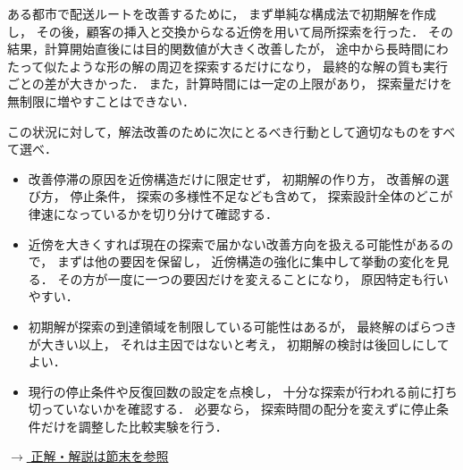 \begin{example}[title={クイズ7：解法の設計1}]
ある都市で配送ルートを改善するために，
まず単純な構成法で初期解を作成し，
その後，顧客の挿入と交換からなる近傍を用いて局所探索を行った．
その結果，計算開始直後には目的関数値が大きく改善したが，
途中から長時間にわたって似たような形の解の周辺を探索するだけになり，
最終的な解の質も実行ごとの差が大きかった．
また，計算時間には一定の上限があり，
探索量だけを無制限に増やすことはできない．

この状況に対して，解法改善のために次にとるべき行動として適切なものをすべて選べ．

\begin{itemize}
\item[(ア)]
改善停滞の原因を近傍構造だけに限定せず，
初期解の作り方，
改善解の選び方，
停止条件，
探索の多様性不足なども含めて，
探索設計全体のどこが律速になっているかを切り分けて確認する．

\item[(イ)]
近傍を大きくすれば現在の探索で届かない改善方向を扱える可能性があるので，
まずは他の要因を保留し，
近傍構造の強化に集中して挙動の変化を見る．
その方が一度に一つの要因だけを変えることになり，
原因特定も行いやすい．

\item[(ウ)]
初期解が探索の到達領域を制限している可能性はあるが，
最終解のばらつきが大きい以上，
それは主因ではないと考え，
初期解の検討は後回しにしてよい．

\item[(エ)]
現行の停止条件や反復回数の設定を点検し，
十分な探索が行われる前に打ち切っていないかを確認する．
必要なら，
探索時間の配分を変えずに停止条件だけを調整した比較実験を行う．
\end{itemize}

\hyperref[ans:heu-multi1-var]{$\rightarrow$ 正解・解説は節末を参照}
\end{example}

